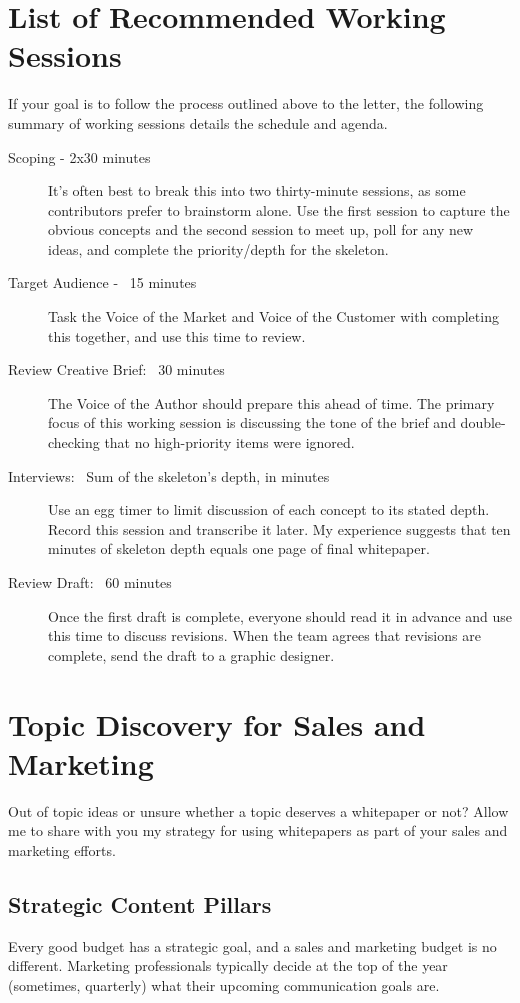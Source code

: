 \documentclass[letterpaper]{article}
\begin{document}
\section{List of Recommended Working Sessions}

If your goal is to follow the process outlined above to the letter, the following summary of working sessions details the schedule and agenda.
\begin{description}
    \item [Scoping - 2x30 minutes] It's often best to break this into two thirty-minute sessions, as some contributors prefer to brainstorm alone. Use the first session to capture the obvious concepts and the second session to meet up, poll for any new ideas, and complete the priority/depth for the skeleton.
    \item [Target Audience - ~15 minutes] Task the Voice of the Market and Voice of the Customer with completing this together, and use this time to review.
    \item [Review Creative Brief: ~30 minutes] The Voice of the Author should prepare this ahead of time. The primary focus of this working session is discussing the tone of the brief and double-checking that no high-priority items were ignored.
    \item [Interviews: ~Sum of the skeleton's depth, in minutes] Use an egg timer to limit discussion of each concept to its stated depth. Record this session and transcribe it later. My experience suggests that ten minutes of skeleton depth equals one page of final whitepaper. 
    \item [Review Draft: ~60 minutes] Once the first draft is complete, everyone should read it in advance and use this time to discuss revisions. When the team agrees that revisions are complete, send the draft to a graphic designer.
\end{description}

\section{Topic Discovery for Sales and Marketing}\label{appendix:topic}
Out of topic ideas or unsure whether a topic deserves a whitepaper or not? Allow me to share with you my strategy for using whitepapers as part of your sales and marketing efforts. 

\subsection{Strategic Content Pillars}
Every good budget has a strategic goal, and a sales and marketing budget is no different. Marketing professionals typically decide at the top of the year (sometimes, quarterly) what their upcoming communication goals are. 
\end{document}

